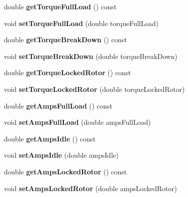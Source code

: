 \begin{DoxyCompactItemize}
double {\bfseries get\+Torque\+Full\+Load} () const
\item 
\mbox{\label{class_motor_data_a38e1656c9bdf7fda71bb38c8f84081db}} 
void {\bfseries set\+Torque\+Full\+Load} (double torque\+Full\+Load)
\item 
\mbox{\label{class_motor_data_a03eba622bcd69dc052e3627e00a8b6a3}} 
double {\bfseries get\+Torque\+Break\+Down} () const
\item 
\mbox{\label{class_motor_data_a7df7b610bdaf5681a5743b6c8c0f0113}} 
void {\bfseries set\+Torque\+Break\+Down} (double torque\+Break\+Down)
\item 
\mbox{\label{class_motor_data_a925ec8dd6c6211d3ed17eaf59a2b8d3a}} 
double {\bfseries get\+Torque\+Locked\+Rotor} () const
\item 
\mbox{\label{class_motor_data_abe381700b30c5c32cb321f549d00072b}} 
void {\bfseries set\+Torque\+Locked\+Rotor} (double torque\+Locked\+Rotor)
\item 
\mbox{\label{class_motor_data_afd764373f8aa8bfb0b5fd16cca6915b7}} 
double {\bfseries get\+Amps\+Full\+Load} () const
\item 
\mbox{\label{class_motor_data_ab57791b83a54024d08e7586fd271f8c3}} 
void {\bfseries set\+Amps\+Full\+Load} (double amps\+Full\+Load)
\item 
\mbox{\label{class_motor_data_a39f6771f83dbd65ae245f99b139a785a}} 
double {\bfseries get\+Amps\+Idle} () const
\item 
\mbox{\label{class_motor_data_ad59e05e9d308b797eb557714c7f24187}} 
void {\bfseries set\+Amps\+Idle} (double amps\+Idle)
\item 
\mbox{\label{class_motor_data_a22917cf90eadc0da1e966257600f5631}} 
double {\bfseries get\+Amps\+Locked\+Rotor} () const
\item 
\mbox{\label{class_motor_data_a65c396ebcd810ce77c5201c19fcfaa81}} 
void {\bfseries set\+Amps\+Locked\+Rotor} (double amps\+Locked\+Rotor)

\end{DoxyCompactItemize}
